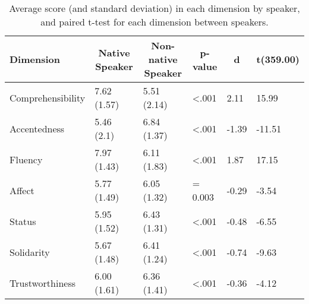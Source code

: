 \documentclass[
  man,floatsintext]{apa7}
\begin{document}
\begin{table}[tbp]

\begin{center}
\begin{threeparttable}

\caption{\label{tab:tab7}Average score (and standard deviation) in each dimension by speaker, and paired t-test for each dimension between speakers. }

\begin{tabular}{llllll}
\toprule
Dimension & \multicolumn{1}{c}{Native Speaker} & \multicolumn{1}{c}{Non-native Speaker} & \multicolumn{1}{c}{p-value} & \multicolumn{1}{c}{d} & \multicolumn{1}{c}{t(359.00)}\\
\midrule
Comprehensibility & 7.62 (1.57) & 5.51 (2.14) & <.001 & 2.11 & 15.99\\
Accentedness & 5.46 (2.1) & 6.84 (1.37) & <.001 & -1.39 & -11.51\\
Fluency & 7.97 (1.43) & 6.11 (1.83) & <.001 & 1.87 & 17.15\\
Affect & 5.77 (1.49) & 6.05 (1.32) & = 0.003 & -0.29 & -3.54\\
Status & 5.95 (1.52) & 6.43 (1.31) & <.001 & -0.48 & -6.55\\
Solidarity & 5.67 (1.48) & 6.41 (1.24) & <.001 & -0.74 & -9.63\\
Trustworthiness & 6.00 (1.61) & 6.36 (1.41) & <.001 & -0.36 & -4.12\\
\bottomrule
\end{tabular}

\end{threeparttable}
\end{center}

\end{table}
\end{document}
